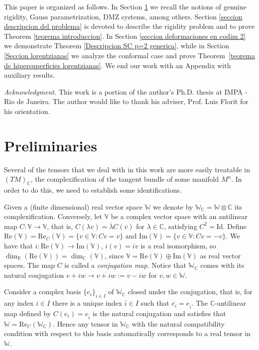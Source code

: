 \documentclass{article}
\theoremstyle{remark}
\begin{document}
This paper is organized as follows. In Section \ref{preliminaries} we recall the notions of genuine rigidity, Gauss parametrization, DMZ systems, among others. Section \ref{seccion descripcion del problema} is devoted to describe the rigidity problem and to prove Theorem \ref{teorema introduccion}. In Section \ref{seccion deformaciones en codim 2} we demonstrate Theorem \ref{Descripcion SC p=2 generica}, while in Section \ref{Seccion lorentzianas} we analyze the conformal case and prove Theorem~\ref{teorema de hipersuperficies lorentzianas}. We end our work with an Appendix with auxiliary results.

\text{ }

{\it Acknowledgment.} This work is a portion of the author's Ph.D. thesis at IMPA - Rio de Janeiro. The author would like to thank his adviser, Prof. Luis Florit for his orientation. 

\section{Preliminaries}\label{preliminaries}

Several of the tensors that we deal with in this work are more easily treatable in $(TM)_\mathbb{C}$,
the complexification of the tangent bundle of some manifold $M^n$. In order to do this, we need to establish some identifications.

Given a (finite dimensional) real vector space $\mathbb{W}$ we denote by $\mathbb{W}_\mathbb{C}=\mathbb{W}\otimes\mathbb{C}$ its complexification. Conversely, let $\mathbb{V}$ be a complex vector space with an antilinear map $C:\mathbb{V}\rightarrow \mathbb{V}$, that is, $C(\lambda v)=\overline{\lambda}C(v)$ for $\lambda\in\mathbb{C}$, satisfying $C^2=\text{Id}$. Define $\text{Re}(\mathbb{V})=\text{Re}_C(\mathbb{V})=\{v\in \mathbb{V}:Cv=v\}$ and $\text{Im}(\mathbb{V})=\{v\in \mathbb{V}:Cv=-v\}$. We have that $i:\text{Re}(\mathbb{V})\rightarrow\text{Im}(\mathbb{V})$, $i(v)=iv$ is a real isomorphism, so $\dim_\mathbb{R}(\text{Re}(\mathbb{V}))=\dim_\mathbb{C}(\mathbb{V})$, since $\mathbb{V}=\text{Re}(\mathbb{V})\oplus\text{Im}(\mathbb{V})$ as real vector spaces. The map $C$ is called a {\it conjugation map}. 
Notice that $\mathbb{W}_{\mathbb{C}}$ comes with its natural conjugation $v+iw\rightarrow\overline{v+iw}:=v-iw$ for $v,w\in\mathbb{W}$.
 

Consider a complex basis $\{e_i\}_{i\in I}$ of $\mathbb{W}_{\mathbb{C}}$ closed under the conjugation, that is, for any index $i\in I$ there is a unique index $\overline{i}\in I$ such that $\overline{e_i}=e_{\overline{i}}$. The $\mathbb{C}$-antilinear map defined by $C(e_i)=e_{\overline{i}}$ is the natural conjugation and satisfies that $\mathbb{W}=\text{Re}_C(\mathbb{W}_{\mathbb{C}})$. Hence any tensor in $\mathbb{W}_{\mathbb{C}}$ with the natural compatibility condition with respect to this basis automatically corresponds to a real tensor in $\mathbb{W}$. 
\end{document}
